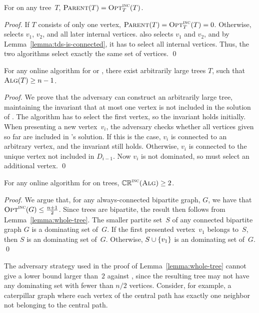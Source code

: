 \begin{lemma}
\label{lemma:tds-trees-alg}
For \tds on any tree~$T$, $\operatorname{\textsc{Parent}}(T) = \operatorname{\textsc{Opt}}^\textsc{\ensuremath{\text{inc}}}_T(T)$.
\end{lemma}
\begin{proof}
If $T$ consists of only one vertex, $\operatorname{\textsc{Parent}}(T) = \operatorname{\textsc{Opt}}^\textsc{\ensuremath{\text{inc}}}_T(T) = 0$.
Otherwise, \aparent selects $v_1$, $v_2$, and all later internal
vertices.
\onopt also selects $v_1$ and $v_2$, and by
Lemma~\ref{lemma:tds-is-connected}, it has to select all internal
vertices.
Thus, the two algorithms select exactly the same set of vertices.
\qed\end{proof}

\begin{lemma}
\label{lemma:whole-tree}
For any online algorithm \A for \ds or \cds, there exist arbitrarily
large trees $T$, such that $\operatorname{\textsc{Alg}}(T) \geq n-1$.
\end{lemma}
\begin{proof}
We prove that the adversary can construct an arbitrarily large tree,
maintaining the invariant that at most 
one vertex is not included in the solution of \A.  The algorithm has
to select the first vertex, so the invariant holds initially.
When presenting a new vertex~$v_{i}$, the adversary
checks whether all vertices given so far are included in \A's
solution.  If this is the case, $v_{i}$ is connected to an arbitrary
vertex, and the invariant still holds.  Otherwise, $v_{i}$ is
connected to the unique vertex not included in $D_{i-1}$.
Now $v_{i}$ is not dominated, so \A must select an additional vertex.
\qed\end{proof}

\begin{proposition}
\label{prop:dsonlower}
For any online algorithm \A for \ds on trees, $\mathbb{CR}^{\textsc{\ensuremath{\text{inc}}}}(\operatorname{\textsc{Alg}}) \ge 2$.
\end{proposition}
\begin{proof}
We argue that, for any always-connected bipartite graph, $G$,
we have that $\operatorname{\textsc{Opt}}^\textsc{\ensuremath{\text{inc}}}(G) \leq \frac{n+1}{2}$.
Since trees are bipartite, the result then follows from Lemma~\ref{lemma:whole-tree}.
The smaller partite set~$S$ of any connected bipartite
graph $G$ is a dominating set of~$G$.
If the first presented vertex~$v_1$ belongs to~$S$, then $S$ is
an \incr dominating set of~$G$. Otherwise, $S\cup\left\{v_1\right\}$ is an
\incr dominating set of~$G$.
\qed\end{proof}

The adversary strategy used in the proof of
Lemma~\ref{lemma:whole-tree} cannot give a
lower bound larger than~$2$ against \offopt, since the resulting tree
may not have any dominating set with fewer than $n/2$ vertices. 
Consider, for example, a caterpillar graph where each vertex of the
central path has exactly one neighbor not belonging to the central
path.

